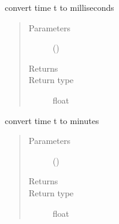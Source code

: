 \documentclass[letterpaper,10pt,english]{sphinxmanual}
\begin{document}
\begin{fulllineitems}
\begin{fulllineitems}
\begin{quote}
\begin{description}
\end{description}\end{quote}

\end{fulllineitems}


\begin{fulllineitems}
\label{\detokenize{Reference:salabim.Environment.to_milliseconds}}
convert time t to milliseconds
\begin{quote}\begin{description}
\item[{Parameters}] \leavevmode
{} () \textendash{} 

\item[{Returns}] \leavevmode
{}

\item[{Return type}] \leavevmode
float

\end{description}\end{quote}

\end{fulllineitems}


\begin{fulllineitems}
\label{\detokenize{Reference:salabim.Environment.to_minutes}}
convert time t to minutes
\begin{quote}\begin{description}
\item[{Parameters}] \leavevmode
{} () \textendash{} 

\item[{Returns}] \leavevmode
{}

\item[{Return type}] \leavevmode
float

\end{description}\end{quote}

\end{fulllineitems}



\end{fulllineitems}
\end{document}
